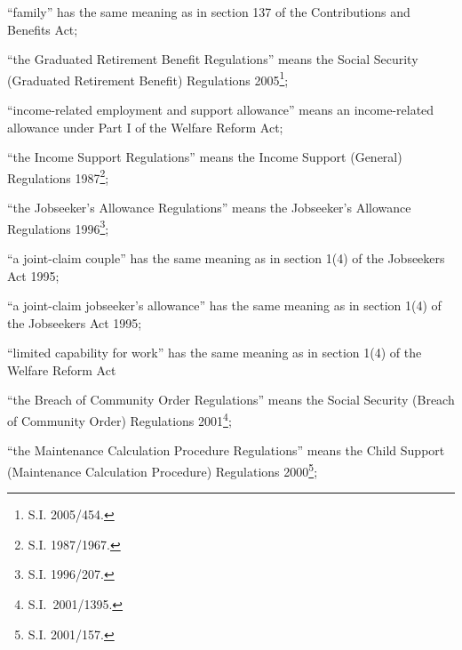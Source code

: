 \documentclass[12pt,a4paper]{article}
\begin{document}
\begin{enumerate}
“family” has the same meaning as in section 137 of the Contributions and Benefits Act;


“the Graduated Retirement Benefit Regulations” means the Social Security (Graduated Retirement Benefit) Regulations 2005\footnote{S.I. 2005/454.};

“income-related employment and support allowance” means an income-related allowance under Part I of the Welfare Reform Act;

“the Income Support Regulations” means the Income Support (General) Regulations 1987\footnote{\frenchspacing S.I. 1987/1967.};

“the Jobseeker’s Allowance Regulations” means the Jobseeker’s Allowance Regulations 1996\footnote{\frenchspacing S.I. 1996/207.};

“a joint-claim couple” has the same meaning as in section 1(4) of the Jobseekers Act 1995;

    “a joint-claim jobseeker’s allowance” has the same meaning as in section 1(4) of the Jobseekers Act 1995;


“limited capability for work” has the same meaning as in section 1(4) of the Welfare Reform Act

“the Breach of Community Order Regulations” means the Social Security (Breach of Community Order) Regulations 2001\footnote{S.I.\ 2001/1395.};

“the Maintenance Calculation Procedure Regulations” means the Child Support (Maintenance Calculation Procedure) Regulations 2000\footnote{\frenchspacing S.I. 2001/157.};


\end{enumerate}
\end{document}

